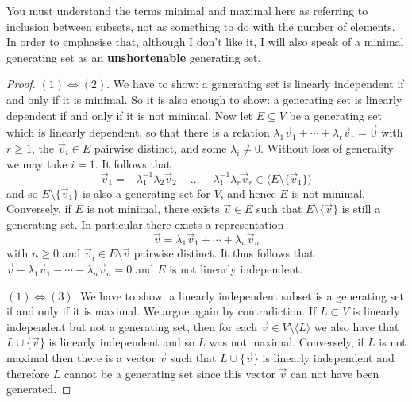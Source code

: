 \documentclass[11pt]{amsbook}
\theoremstyle{definition}
\begin{document}
You must understand the terms minimal and maximal here as referring to inclusion between subsets, not as something to do with the number of elements. In order to emphasise that, although I don't like it, I will also speak of a minimal generating set as an {\bf unshortenable} generating set.

\begin{proof} $(1) \Leftrightarrow (2)$. We have to show: a generating set is linearly independent if and only if it is minimal. So it is also enough to show: a generating set is linearly dependent if and only if it is not minimal. Now let $E\subseteq V$ be a generating set which is linearly dependent, so that there is a relation $\lambda_1\vec{v}_1 + \cdots +  \lambda_r\vec{v}_r = \vec{0}$ with $r\geqslant 1$, the $\vec{v}_i\in E$ pairwise distinct, and some $\lambda_i \neq 0$. Without loss of generality we may take $i=1$. It follows that $$\vec{v}_1 = -\lambda_1^{-1}\lambda_2\vec{v}_2 - \ldots - \lambda_1^{-1}\lambda_r\vec{v}_r\in \langle E\setminus \{\vec{v}_1 \}\rangle$$ and so $E\setminus \{\vec{v}_1\}$ is also a generating set for $V$, and hence $E$ is not minimal. Conversely, if $E$ is not minimal, there exists $\vec{v}\in E$ such that $E\setminus \{\vec{v}\}$ is still a generating set. In particular there exists a representation $$\vec{v} = \lambda_1 \vec{v}_1 + \cdots + \lambda_n \vec{v}_n$$ with $n\geqslant 0$ and $\vec{v}_i\in E\setminus \vec{v}$ pairwise distinct. It thus follows that $\vec{v} - \lambda_1 \vec{v}_1 - \cdots - \lambda_n \vec{v}_n =0$ and $E$ is not linearly independent.

$(1) \Leftrightarrow (3)$. We have to show: a linearly independent subset is a generating set if and only if it is maximal. We argue again by contradiction. If $L\subset V$ is linearly independent but not a generating set, then for each $\vec{v} \in V \setminus \langle L \rangle$ we also have that $L\cup \{ \vec{v} \}$ is linearly independent and so $L$ was not maximal. Conversely, if $L$ is not maximal then there is a vector $\vec{v}$ such that $L\cup \{ \vec{v}\}$ is linearly independent and therefore $L$ cannot be a generating set since this vector $\vec{v}$ can not have been generated. \end{proof}
\end{document}
